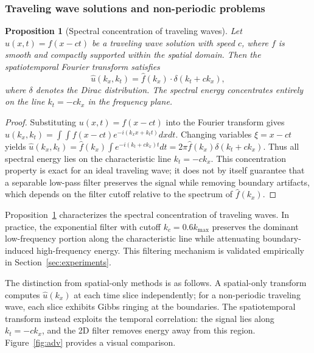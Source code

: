 \documentclass[preprint,12pt]{elsarticle}
\newtheorem{proposition}{Proposition}
\begin{document}
\subsubsection{Traveling wave solutions and non-periodic problems}

\begin{proposition}[Spectral concentration of traveling waves]
\label{prop:traveling}
Let $u(x,t) = f(x - ct)$ be a traveling wave solution with speed $c$, where $f$ is smooth and compactly supported within the spatial domain. Then the spatiotemporal Fourier transform satisfies
\begin{equation}
\hat{u}(k_x, k_t) = \hat{f}(k_x) \cdot \delta(k_t + c k_x),
\end{equation}
where $\delta$ denotes the Dirac distribution. The spectral energy concentrates entirely on the line $k_t = -c k_x$ in the frequency plane.
\end{proposition}

\begin{proof}
Substituting $u(x,t)=f(x-ct)$ into the Fourier transform gives
$\hat{u}(k_x,k_t) = \int\int f(x-ct) e^{-i(k_x x + k_t t)} dx dt$.
Changing variables $\xi = x-ct$ yields $\hat{u}(k_x,k_t) = \hat{f}(k_x) \int e^{-i(k_t + c k_x)t} dt = 2\pi \hat{f}(k_x) \delta(k_t + c k_x)$.
Thus all spectral energy lies on the characteristic line $k_t = -ck_x$. This concentration property is exact for an ideal traveling wave; it does not by itself guarantee that a separable low-pass filter preserves the signal while removing boundary artifacts, which depends on the filter cutoff relative to the spectrum of $\hat{f}(k_x)$.
\end{proof}

Proposition~\ref{prop:traveling} characterizes the spectral concentration of traveling waves. In practice, the exponential filter with cutoff $k_c=0.6k_{\max}$ preserves the dominant low-frequency portion along the characteristic line while attenuating boundary-induced high-frequency energy. This filtering mechanism is validated empirically in Section~\ref{sec:experiments}.

The distinction from spatial-only methods is as follows. A spatial-only transform computes $\hat{u}(k_x)$ at each time slice independently; for a non-periodic traveling wave, each slice exhibits Gibbs ringing at the boundaries. The spatiotemporal transform instead exploits the temporal correlation: the signal lies along $k_t=-ck_x$, and the 2D filter removes energy away from this region. Figure~\ref{fig:adv} provides a visual comparison.
\end{document}
